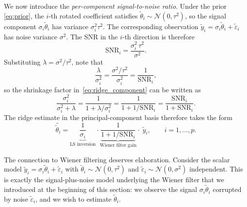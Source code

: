 We now introduce the \emph{per-component signal-to-noise ratio}.  Under the
prior \eqref{eq:prior}, the $i$-th rotated coefficient satisfies
$\tilde\theta_i \sim \mathcal{N}(0, \tau^2)$, so the signal component
$\sigma_i\tilde\theta_i$ has variance $\sigma_i^2\tau^2$.  The corresponding
observation $\tilde y_i = \sigma_i\tilde\theta_i + \tilde\varepsilon_i$ has
noise variance $\sigma^2$.  The SNR in the $i$-th  direction is
therefore
\begin{equation}
  \label{eq:snr_def}
  \mathrm{SNR}_i
  = \frac{\sigma_i^2\,\tau^2}{\sigma^2}.
\end{equation}
Substituting $\lambda = \sigma^2/\tau^2$, note that
\begin{equation}
  \label{eq:lambda_snr}
  \frac{\lambda}{\sigma_i^2}
  = \frac{\sigma^2/\tau^2}{\sigma_i^2}
  = \frac{1}{\mathrm{SNR}_i},
\end{equation}
so the shrinkage factor in~\eqref{eq:ridge_component} can be written as
\begin{equation}
  \label{eq:shrinkage_snr}
  \frac{\sigma_i^2}{\sigma_i^2 + \lambda}
  = \frac{1}{1 + \lambda/\sigma_i^2}
  = \frac{1}{1 + 1/\mathrm{SNR}_i}
    = \frac{\mathrm{SNR}_i}{1 + \mathrm{SNR}_i}.
\end{equation}
The ridge estimate in the principal-component basis therefore takes the form
\begin{equation} \label{eq:wiener_form}
 \hat{\tilde\theta}_i
  = \underbrace{\frac{1}{\sigma_i}}_{\text{LS inversion}}
\cdot  \underbrace{\frac{1}{1 + 1/\mathrm{SNR}_i}}_{\text{Wiener filter gain}}
    \cdot\;
    \tilde y_i,
    \qquad i = 1, \ldots, p.
\end{equation}


The connection to Wiener filtering deserves elaboration.  Consider the scalar
model $\tilde y_i = \sigma_i\tilde\theta_i + \tilde\varepsilon_i$ with
$\tilde\theta_i \sim \mathcal{N}(0,\tau^2)$ and
$\tilde\varepsilon_i \sim \mathcal{N}(0,\sigma^2)$ independent.  This is
exactly the signal-plus-noise model underlying the Wiener filter that we introduced at the beginning of this section: we observe the signal $\sigma_i\tilde\theta_i$
corrupted by noise $\tilde\varepsilon_i$, and we wish to estimate
$\tilde\theta_i$.

